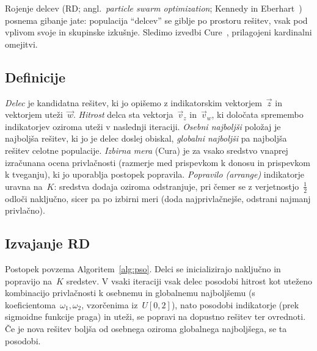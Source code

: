 Rojenje delcev (RD; angl.\ \emph{particle swarm optimization}; Kennedy in Eberhart~\cite{kennedy1995}) posnema gibanje jate: populacija ``delcev'' se giblje po prostoru rešitev, vsak pod vplivom svoje in skupinske izkušnje. Sledimo izvedbi Cure~\cite{cura2009}, prilagojeni kardinalni omejitvi.

\subsection{Definicije}
\emph{Delec} je kandidatna rešitev, ki jo opišemo z indikatorskim vektorjem~$\vec{z}$ in vektorjem uteži~$\vec{w}$. \emph{Hitrost} delca sta vektorja~$\vec{v}_z$ in~$\vec{v}_w$, ki določata spremembo indikatorjev oziroma uteži v naslednji iteraciji. \emph{Osebni najboljši} položaj je najboljša rešitev, ki jo je delec doslej obiskal, \emph{globalni najboljši} pa najboljša rešitev celotne populacije. \emph{Izbirna mera} (Cura) je za vsako sredstvo vnaprej izračunana ocena privlačnosti (razmerje med prispevkom k donosu in prispevkom k tveganju), ki jo uporablja postopek popravila. \emph{Popravilo (arrange)} indikatorje uravna na~$K$: sredstva dodaja oziroma odstranjuje, pri čemer se z verjetnostjo~$\tfrac12$ odloči naključno, sicer pa po izbirni meri (doda najprivlačnejše, odstrani najmanj privlačno).

\subsection{Izvajanje RD}
Postopek povzema Algoritem~\ref{alg:pso}. Delci se inicializirajo naključno in popravijo na~$K$ sredstev. V vsaki iteraciji vsak delec posodobi hitrost kot uteženo kombinacijo privlačnosti k osebnemu in globalnemu najboljšemu (s koeficientoma~$\omega_1,\omega_2$, vzorčenima iz~$U[0,2]$), nato posodobi indikatorje (prek sigmoidne funkcije praga) in uteži, se popravi na dopustno rešitev ter ovrednoti. Če je nova rešitev boljša od osebnega oziroma globalnega najboljšega, se ta posodobi.

